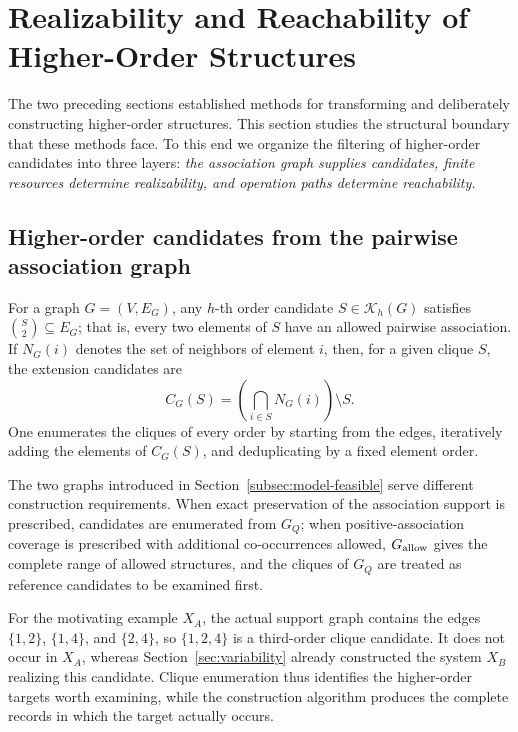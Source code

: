 \documentclass[11pt,a4paper]{article}
\numberwithin{equation}{section}
\theoremstyle{definition}
\numberwithin{algorithm}{section}
\begin{document}
\section{Realizability and Reachability of Higher-Order Structures}\label{sec:boundary}

The two preceding sections established methods for transforming and deliberately
constructing higher-order structures.
This section studies the structural boundary that these methods face.
To this end we organize the filtering of higher-order candidates into three layers:
\emph{the association graph supplies candidates, finite resources determine realizability,
and operation paths determine reachability.}

\subsection{Higher-order candidates from the pairwise association graph}\label{subsec:boundary-graph}

For a graph $G=(V,E_G)$, any $h$-th order candidate $S\in\mathcal K_h(G)$ satisfies
$\binom S2\subseteq E_G$;
that is, every two elements of $S$ have an allowed pairwise association.
If $N_G(i)$ denotes the set of neighbors of element $i$, then, for a given clique $S$, the
extension candidates are
\begin{equation}
C_G(S)=\left(\bigcap_{i\in S}N_G(i)\right)\setminus S.
\label{eq:clique-extension}
\end{equation}
One enumerates the cliques of every order by starting from the edges, iteratively adding the
elements of $C_G(S)$, and deduplicating by a fixed element order.

The two graphs introduced in Section~\ref{subsec:model-feasible} serve different construction
requirements.
When exact preservation of the association support is prescribed, candidates are enumerated
from $G_Q$;
when positive-association coverage is prescribed with additional co-occurrences allowed,
$G_{\rm allow}$ gives the complete range of allowed structures, and the cliques of $G_Q$ are
treated as reference candidates to be examined first.

For the motivating example $X_A$, the actual support graph contains the edges $\{1,2\}$,
$\{1,4\}$, and $\{2,4\}$, so $\{1,2,4\}$ is a third-order clique candidate.
It does not occur in $X_A$, whereas Section~\ref{sec:variability} already constructed the
system $X_B$ realizing this candidate.
Clique enumeration thus identifies the higher-order targets worth examining, while the
construction algorithm produces the complete records in which the target actually occurs.
\end{document}
